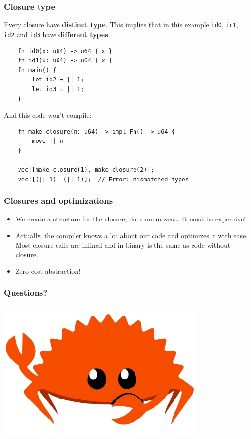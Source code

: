 \documentclass[aspectratio=1610,t]{beamer}
\begin{document}

\begin{frame}[fragile,c]
\frametitle{Closure type}
Every closure have \textbf{distinct type}. This implies that in this example \texttt{id0}, \texttt{id1}, \texttt{id2} and \texttt{id3} have \textbf{different types}.

\begin{verbatim}
    fn id0(x: u64) -> u64 { x }
    fn id1(x: u64) -> u64 { x }
    fn main() {
        let id2 = || 1;
        let id3 = || 1;
    }
\end{verbatim}

And this code won't compile:

\begin{verbatim}
    fn make_closure(n: u64) -> impl Fn() -> u64 {
        move || n
    }

    vec![make_closure(1), make_closure(2)];
    vec![(|| 1), (|| 1)];  // Error: mismatched types
\end{verbatim}
\end{frame}


\begin{frame}[fragile]
\frametitle{Closures and optimizations}
\begin{itemize}
    \item<1-> We create a structure for the closure, do some moves... It must be expensive!
    \item<2-> Actually, the compiler knows a lot about our code and optimizes it with ease. Most closure calls are inlined and in binary is the same as code without closure.
    \item<3-> Zero cost abstraction!
\end{itemize}
\end{frame}


\begin{frame}
\frametitle{Questions?}
\begin{center}
\includegraphics[width=\textwidth,height=7cm,keepaspectratio]{images/crab.jpg}
\end{center}
\end{frame}

\end{document}
